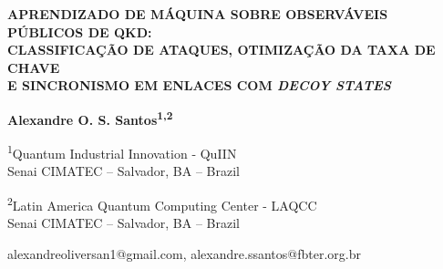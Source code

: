 \documentclass[12pt]{article}
\begin{document}
\begin{center}
{\large\bfseries APRENDIZADO DE MÁQUINA SOBRE OBSERVÁVEIS PÚBLICOS DE QKD:\\[0.2em]
CLASSIFICAÇÃO DE ATAQUES, OTIMIZAÇÃO DA TAXA DE CHAVE\\[0.2em]
E SINCRONISMO EM ENLACES COM \emph{DECOY STATES}}

\vspace{1.0em}
{\bfseries Alexandre O. S. Santos\textsuperscript{1,2}}

\vspace{0.9em}
\textsuperscript{1}Quantum Industrial Innovation - QuIIN\\
Senai CIMATEC -- Salvador, BA -- Brazil

\vspace{0.5em}
\textsuperscript{2}Latin America Quantum Computing Center - LAQCC\\
Senai CIMATEC -- Salvador, BA -- Brazil

\vspace{0.7em}
{\ttfamily\small alexandreoliversan1@gmail.com, alexandre.ssantos@fbter.org.br}
\end{center}

\vspace{0.8em}
\end{document}
